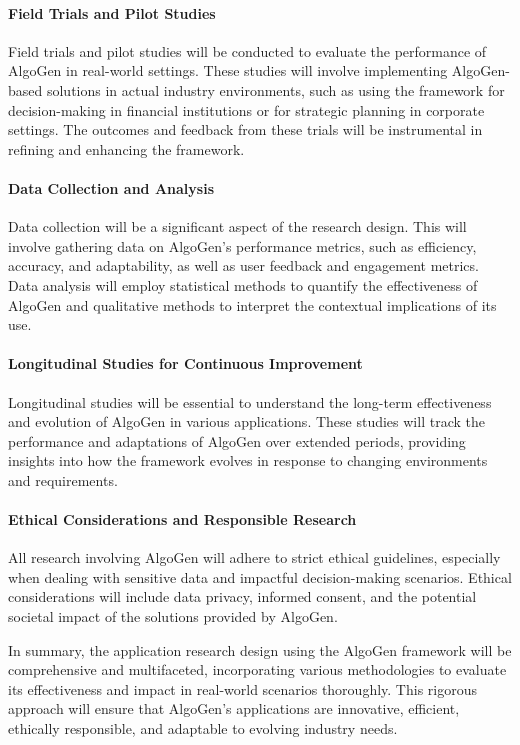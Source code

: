 \documentclass{article}
\begin{document}
\paragraph{Field Trials and Pilot Studies}
Field trials and pilot studies will be conducted to evaluate the performance of AlgoGen in real-world settings. These studies will involve implementing AlgoGen-based solutions in actual industry environments, such as using the framework for decision-making in financial institutions or for strategic planning in corporate settings. The outcomes and feedback from these trials will be instrumental in refining and enhancing the framework.

\paragraph{Data Collection and Analysis}
Data collection will be a significant aspect of the research design. This will involve gathering data on AlgoGen’s performance metrics, such as efficiency, accuracy, and adaptability, as well as user feedback and engagement metrics. Data analysis will employ statistical methods to quantify the effectiveness of AlgoGen and qualitative methods to interpret the contextual implications of its use.

\paragraph{Longitudinal Studies for Continuous Improvement}
Longitudinal studies will be essential to understand the long-term effectiveness and evolution of AlgoGen in various applications. These studies will track the performance and adaptations of AlgoGen over extended periods, providing insights into how the framework evolves in response to changing environments and requirements.

\paragraph{Ethical Considerations and Responsible Research}
All research involving AlgoGen will adhere to strict ethical guidelines, especially when dealing with sensitive data and impactful decision-making scenarios. Ethical considerations will include data privacy, informed consent, and the potential societal impact of the solutions provided by AlgoGen.

In summary, the application research design using the AlgoGen framework will be comprehensive and multifaceted, incorporating various methodologies to evaluate its effectiveness and impact in real-world scenarios thoroughly. This rigorous approach will ensure that AlgoGen’s applications are innovative, efficient, ethically responsible, and adaptable to evolving industry needs.
\end{document}
